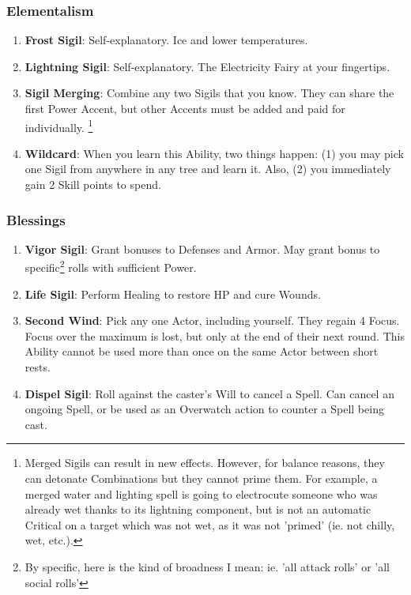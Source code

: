 \subsubsection{Elementalism}
\begin{enumerate}
    \item \textbf{Frost Sigil}: Self-explanatory. Ice and lower temperatures.
    \item \textbf{Lightning Sigil}: Self-explanatory. The Electricity Fairy at your fingertips.
    \item \textbf{Sigil Merging}: Combine any two Sigils that you know. They can share the first Power Accent, but other Accents must be added and paid for individually. \footnote{Merged Sigils can result in new effects. However, for balance reasons, they can detonate Combinations but they cannot prime them. For example, a merged water and lighting spell is going to electrocute someone who was already wet thanks to its lightning component, but is not an automatic Critical on a target which was not wet, as it was not 'primed' (ie. not chilly, wet, etc.).}
    \item \textbf{Wildcard}: When you learn this Ability, two things happen: (1) you may pick one Sigil from anywhere in any tree and learn it. Also, (2) you immediately gain 2 Skill points to spend.
\end{enumerate}

\subsubsection{Blessings}
\begin{enumerate}
    \item \textbf{Vigor Sigil}: Grant bonuses to Defenses and Armor. May grant bonus to specific\footnote{By specific, here is the kind of broadness I mean: ie. 'all attack rolls' or 'all social rolls'} rolls with sufficient Power.
    \item \textbf{Life Sigil}: Perform Healing to restore HP and cure Wounds.
    \item \textbf{Second Wind}: Pick any one Actor, including yourself. They regain 4 Focus. Focus over the maximum is lost, but only at the end of their next round. This Ability cannot be used more than once on the same Actor between short rests.
    \item \textbf{Dispel Sigil}: Roll against the caster's Will to cancel a Spell. Can cancel an ongoing Spell, or be used as an Overwatch action to counter a Spell being cast.
\end{enumerate}

